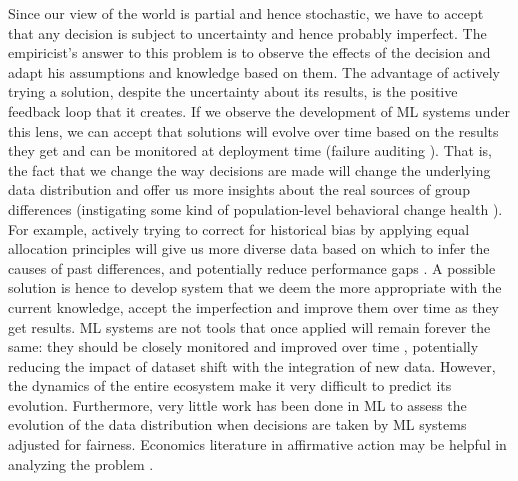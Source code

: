     Since our view of the world is partial and hence stochastic, we have to accept that any decision is subject to uncertainty and hence probably imperfect.
    The empiricist's answer to this problem is to observe the effects of the decision and adapt his assumptions and knowledge based on them.
    The advantage of actively trying a solution, despite the uncertainty about its results, is the positive feedback loop that it creates.
    If we observe the development of ML systems under this lens, we can accept that solutions will evolve over time based on the results they get  and can be monitored at deployment time (failure auditing \cite{Chen2021}).
    That is, the fact that we change the way decisions are made will change the underlying data distribution and offer us more insights about the real sources of group differences (instigating some kind of population-level behavioral change health \cite[p.~5]{Morley2020}).
    For example, actively trying to correct for historical bias by applying equal allocation principles \cite[p.~6]{Rajkomar2018} will give us more diverse data based on which to infer the causes of past differences, and potentially reduce performance gaps \cite{Chen2021}.
    A possible solution is hence to develop system that we deem the more appropriate with the current knowledge, accept the imperfection and improve them over time as they get results.
    ML systems are not tools that once applied will remain forever the same: they should be closely monitored and improved over time \cite[p.~7]{Rajkomar2018}, potentially reducing the impact of dataset shift with the integration of new data.
    However, the dynamics of the entire ecosystem make it very difficult to predict its evolution.
    Furthermore, very little work has been done in ML to assess the evolution of the data distribution when decisions are taken by ML systems adjusted for fairness.
    Economics literature in affirmative action may be helpful in analyzing the problem \cite{Chouldechova2020}.




